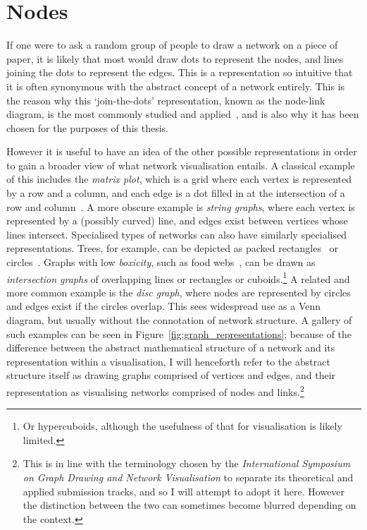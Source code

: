 \chapter{Nodes}
If one were to ask a random group of people to draw a network on a piece of paper, it is likely that most would draw dots to represent the nodes, and lines joining the dots to represent the edges. This is a representation so intuitive that it is often synonymous with the abstract concept of a network entirely.
This is the reason why this `join-the-dots' representation, known as the node-link diagram, is the most commonly studied and applied~\cite{Ghoniem2004}, and is also why it has been chosen for the purposes of this thesis.

However it is useful to have an idea of the other possible representations in order to gain a broader view of what network visualisation entails. A classical example of this includes the \emph{matrix plot}, which is a grid where each vertex is represented by a row and a column, and each edge is a dot filled in at the intersection of a row and column~\cite{Liiv2010}.
A more obscure example is \emph{string graphs}, where each vertex is represented by a (possibly curved) line, and edges exist between vertices whose lines intersect.
Specialised types of networks can also have similarly specialised representations. Trees, for example, can be depicted as packed rectangles~\cite{Johnson1991} or circles~\cite{Wang2006}.
Graphs with low \emph{boxicity}, such as food webs~\cite{Eklof2013}, can be drawn as \emph{intersection graphs} of overlapping lines or rectangles or cuboids.\footnote{Or hypercuboids, although the usefulness of that for visualisation is likely limited.}
A related and more common example is the \emph{disc graph}, where nodes are represented by circles and edges exist if the circles overlap. This sees widespread use as a Venn diagram, but usually without the connotation of network structure.
A gallery of such examples can be seen in Figure~\ref{fig:graph_representations}; because of the difference between the abstract mathematical structure of a network and its representation within a visualisation, I will henceforth refer to the abstract structure itself as drawing graphs comprised of vertices and edges, and their representation as visualising networks comprised of nodes and links.\footnote{This is in line with the terminology chosen by the \emph{International Symposium on Graph Drawing and Network Visualisation} to separate its theoretical and applied submission tracks, and so I will attempt to adopt it here. However the distinction between the two can sometimes become blurred depending on the context.}

